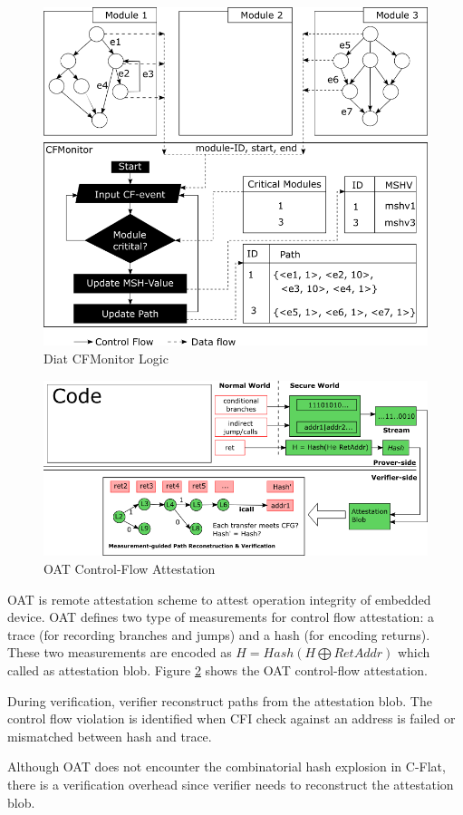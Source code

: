 \begin{figure}[htbp]
\centerline{\includegraphics[scale=.5]{Figures/01/diat-cfmonitort.png}}
\caption{Diat CFMonitor Logic}
\label{fig:diat}
\end{figure}

\begin{figure}[htbp]
\centerline{\includegraphics[scale=.85]{Figures/01/oat.png}}
\caption{OAT Control-Flow Attestation}
\label{fig:oat}
\end{figure}

OAT \cite{sunOATAttestingOperation2020} is remote attestation scheme to attest
operation integrity of embedded device. OAT defines two type of measurements for
control flow attestation: a trace (for recording branches and jumps) and a hash
(for encoding returns). These two measurements are encoded as $H = Hash(H
\bigoplus RetAddr)$ which called as attestation blob. Figure \ref{fig:oat} shows
the OAT control-flow attestation.

During verification, verifier reconstruct paths from the attestation blob. The
control flow violation is identified when CFI check against an address is failed
or mismatched between hash and trace.

Although OAT does not encounter the combinatorial hash explosion in C-Flat,
there is a verification overhead since verifier needs to reconstruct the
attestation blob. 
